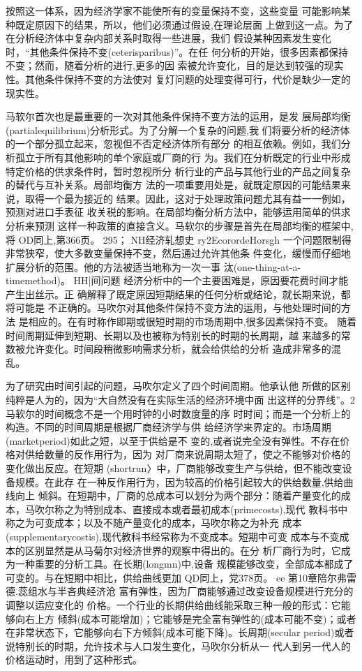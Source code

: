 按照这一体系，因为经济学家不能使所有的变量保持不变，这些变量
可能影响某种既定原因下的结果，所以，他们必须通过假设,在理论层面
上做到这一点。为了在分析经济体中复杂内部关系时取得一些进展，我们
假设某种因素发生变化时，“其他条件保持不变(ceterisparibus)”。在任
何分析的开始，很多因素都保持不变；然而，随着分析的进行,更多的因
索被允许变化，目的是达到较强的现实性。其他条件保持不变的方法使对
复灯问题的处理变得可行，代价是缺少一定的现实性。

马软尔首次也是最重要的一次对其他条件保持不变方法的运用，是发
展局部均衡(partialequilibrium)分析形式。为了分解一个复杂的问题,我
们将要分析的经济体的一个部分孤立起来，忽视但不否定经济体所有部分
的相互依赖。例如，我们分析孤立于所有其他影响的单个家庭或厂商的行
为。我们在分析既定的行业中形成特定价格的供求条件时，暂时忽视所分
析行业的产品与其他行业的产品之间复杂的替代与互补关系。局部均衡方
法的一项重要用处是，就既定原因的可能结果来说，取得一个最为接近的
结果。因此，这对于处理政策问题尤其有益一一例如，预测对进口手表征
收关税的影响。在局部均衡分析方法中，能够运用简单的供求分析来预测
这样一种政策的直接含义。马软尔的步骤是首先在局部均衡的框架中,将
OD同上,第366页。
295；
NH经济轧想史
ry2EcorordeHorsgh
一个问题限制得非常狭窄，使大多数变量保持不变，然后通过允许其他条
件变化，缓慢而仔细地扩展分析的范围。他的方法被适当地称为一次一事
汰(one-thing-at-a-timemethod)。
HH|间问题
经济分析中的一个主要困难是，原因要花费时间才能产生出丝示。正
确解释了既定原因短期结果的任何分析或结论，就长期来说，都将可能是
不正确的。马吹尔对其他条件保持不变方法的运用，与他处理时间的方法
是相应的。在有时称作即期或很短时期的市场周期中,很多因素保持不变。
随着时间周期延伸到短期、长期以及也被称为特别长的时期的长周期，越
来越多的常数被允许变化。时间段稍微影响需求分析，就会给供给的分析
造成非常多的混乱。

为了研究由时间引起的问题，马吹尔定义了四个时间周期。他承认他
所做的区别纯粹是人为的，因为“大自然没有在实际生活的经济环境中面
出这样的分界线”。2马软尔的时间概念不是一个用时钟的小时数度量的序
时时间；而是一个分析上的构造。不同的时间周期是根据厂商经济学与供
给经济学来界定的。市场周期(marketperiod)如此之短，以至于供给是不
变的,或者说完全没有弹性。不存在价格对供给数量的反作用行为，因为
对厂商来说周期太短了，使之不能够对价格的变化做出反应。在短期
(shortrun〉中，厂商能够改变生产与供给，但不能改变设备规模。在此存
在一种反作用行为，因为较高的价格引起较大的供给数量,供给曲线向上
倾斜。在短期中，厂商的总成本可以划分为两个部分：随着产量变化的成
本，马吹尔称之为特别成本、直接成本或者最初成本(primecosts),现代
教科书中称之为可变成本；以及不随产量变化的成本，马吹尔称之为补充
成本(supplementarycostis),现代教科书经常称为不变成本。短期中可变
成本与不变成本的区别显然是从马菊尔对经济世界的观察中得出的。在分
析厂商行为时，它成为一种重要的分析工具。在长期(longmn)中,设备
规模能够改变，全部成本都成了可变的。与在短期中相比，供给曲线更加
QD同上，党378页。
ee
第10章陪尔弗雷德.蕊组水与半吝典经济沧
富有弹性，因为厂商能够通过改变设备规模进行充分的调整以运应变化的
价格。一个行业的长期供给曲线能采取三种一般的形式：它能够向右上方
倾斜(成本可能增加)；它能够是完全富有弹性的(成本可能不变)；或者
在非常状态下，它能够向右下方倾斜(成本可能下降)。长周期(secular
period)或者说特别长的时期，允许技术与人口发生变化，马吹尔分析从一
代人到另一代人的价格运动时，用到了这种形式。

